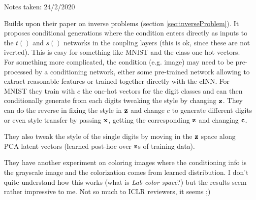 \begin{notebox}

\hfill Notes taken: 24/2/2020 
\end{notebox}

Builds upon their paper on inverse problems (section \ref{sec:inverseProblem}).
It proposes conditional generations where the condition enters directly as inputs to the $t()$ and $s()$ networks in the coupling layers (this is ok, since these are not iverted). This is easy for something like MNIST and the class one hot vectors. For something more complicated, the condition (e.g. image) may need to be pre-processed by a conditioning network, either some pre-trained network allowing to extract reasonable features or trained together directly with the cINN.
For MNIST they train with $c$ the one-hot vectors for the digit classes and can then conditionally generate from each digits tweaking the style by changing $\mathbf{z}$. They can do the reverse in fixing the style in $\mathbf{z}$ and change $c$ to generate different digits or even style transfer by passing $\mathbf{x}$, getting the corresponding $\mathbf{z}$ and changing $\mathbf{c}$.

They also tweak the style of the single digits by moving in the $\mathbf{z}$ space along PCA latent vectors (learned post-hoc over $\mathbf{z}$s of training data).

They have another experiment on coloring images where the conditioning info is the grayscale image and the colorization comes from learned distribution. I don't quite understand how this works (what is \emph{Lab color space}?) but the results seem rather impressive to me. Not so much to ICLR reviewers, it seems ;)
